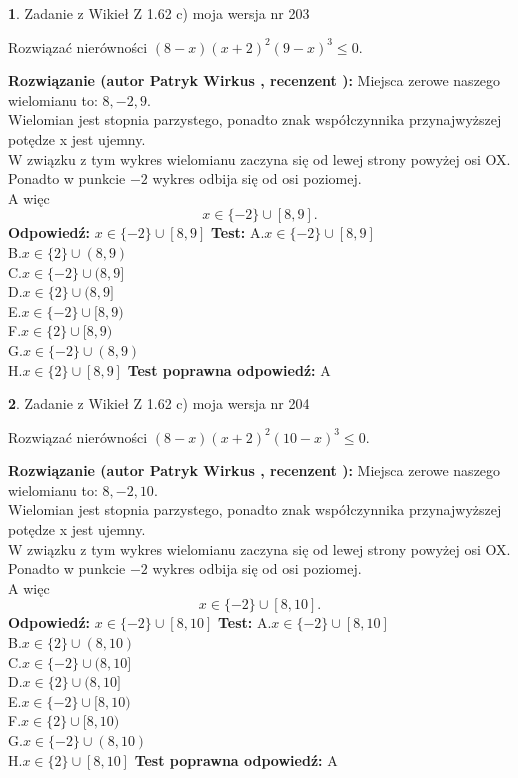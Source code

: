 \documentclass[12pt, a4paper]{article}
\theoremstyle{definition} %
\newtheorem{zad}{}
\newcommand{\zadStart}[1]{\begin{zad}#1\newline}
\newcommand{\zadStop}{\end{zad}}
\newcommand{\rozwStart}[2]{\noindent \textbf{Rozwiązanie (autor #1 , recenzent #2): }\newline}
\newcommand{\rozwStop}{\newline}
\newcommand{\odpStart}{\noindent \textbf{Odpowiedź:}\newline}
\newcommand{\odpStop}{\newline}
\newcommand{\testStart}{\noindent \textbf{Test:}\newline}
\newcommand{\testStop}{\newline}
\newcommand{\kluczStart}{\noindent \textbf{Test poprawna odpowiedź:}\newline}
\newcommand{\kluczStop}{\newline}
\begin{document}
\zadStart{Zadanie z Wikieł Z 1.62 c) moja wersja nr 203}

Rozwiązać nierówności $(8-x)(x+2)^{2}(9-x)^{3}\le0$.
\zadStop
\rozwStart{Patryk Wirkus}{}
Miejsca zerowe naszego wielomianu to: $8, -2, 9$.\\
Wielomian jest stopnia parzystego, ponadto znak współczynnika przy\linebreak najwyższej potędze x jest ujemny.\\ W związku z tym wykres wielomianu zaczyna się od lewej strony powyżej osi OX.\\
Ponadto w punkcie $-2$ wykres odbija się od osi poziomej.\\
A więc $$x \in \{-2\} \cup [8,9].$$
\rozwStop
\odpStart
$x \in \{-2\} \cup [8,9]$
\odpStop
\testStart
A.$x \in \{-2\} \cup [8,9]$\\
B.$x \in \{2\} \cup (8,9)$\\
C.$x \in \{-2\} \cup (8,9]$\\
D.$x \in \{2\} \cup (8,9]$\\
E.$x \in \{-2\} \cup [8,9)$\\
F.$x \in \{2\} \cup [8,9)$\\
G.$x \in \{-2\} \cup (8,9)$\\
H.$x \in \{2\} \cup [8,9]$
\testStop
\kluczStart
A
\kluczStop



\zadStart{Zadanie z Wikieł Z 1.62 c) moja wersja nr 204}

Rozwiązać nierówności $(8-x)(x+2)^{2}(10-x)^{3}\le0$.
\zadStop
\rozwStart{Patryk Wirkus}{}
Miejsca zerowe naszego wielomianu to: $8, -2, 10$.\\
Wielomian jest stopnia parzystego, ponadto znak współczynnika przy\linebreak najwyższej potędze x jest ujemny.\\ W związku z tym wykres wielomianu zaczyna się od lewej strony powyżej osi OX.\\
Ponadto w punkcie $-2$ wykres odbija się od osi poziomej.\\
A więc $$x \in \{-2\} \cup [8,10].$$
\rozwStop
\odpStart
$x \in \{-2\} \cup [8,10]$
\odpStop
\testStart
A.$x \in \{-2\} \cup [8,10]$\\
B.$x \in \{2\} \cup (8,10)$\\
C.$x \in \{-2\} \cup (8,10]$\\
D.$x \in \{2\} \cup (8,10]$\\
E.$x \in \{-2\} \cup [8,10)$\\
F.$x \in \{2\} \cup [8,10)$\\
G.$x \in \{-2\} \cup (8,10)$\\
H.$x \in \{2\} \cup [8,10]$
\testStop
\kluczStart
A
\kluczStop
\end{document}
